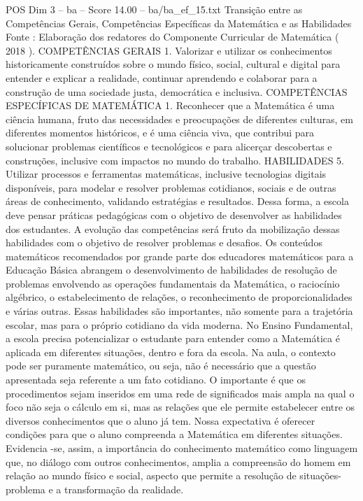 \begin{textsample}{POS Dim 3 – ba – Score 14.00 – ba/ba\_ef\_15.txt}
Transição entre as Competências Gerais, Competências Específicas da Matemática e as Habilidades Fonte : Elaboração dos redatores do Componente Curricular de Matemática ( 2018 ).
COMPETÊNCIAS GERAIS 1.
Valorizar e utilizar os conhecimentos historicamente construídos sobre o mundo físico, social, cultural e digital para entender e explicar a realidade, continuar aprendendo e colaborar para a construção de uma sociedade justa, democrática e inclusiva.
COMPETÊNCIAS ESPECÍFICAS DE MATEMÁTICA 1.
Reconhecer que a Matemática é uma ciência humana, fruto das necessidades e preocupações de diferentes culturas, em diferentes momentos históricos, e é uma ciência viva, que contribui para solucionar problemas científicos e tecnológicos e para alicerçar descobertas e construções, inclusive com impactos no mundo do trabalho.
HABILIDADES 5.
Utilizar processos e ferramentas matemáticas, inclusive tecnologias digitais disponíveis, para modelar e resolver problemas cotidianos, sociais e de outras áreas de conhecimento, validando estratégias e resultados.
Dessa forma, a escola deve pensar práticas pedagógicas com o objetivo de desenvolver as habilidades dos estudantes.
A evolução das competências será fruto da mobilização dessas habilidades com o objetivo de resolver problemas e desafios.
Os conteúdos matemáticos recomendados por grande parte dos educadores matemáticos para a Educação Básica abrangem o desenvolvimento de habilidades de resolução de problemas envolvendo as operações fundamentais da Matemática, o raciocínio algébrico, o estabelecimento de relações, o reconhecimento de proporcionalidades e várias outras.
Essas habilidades são importantes, não somente para a trajetória escolar, mas para o próprio cotidiano da vida moderna.
No Ensino Fundamental, a escola precisa potencializar o estudante para entender como a Matemática é aplicada em diferentes situações, dentro e fora da escola.
Na aula, o contexto pode ser puramente matemático, ou seja, não é necessário que a questão apresentada seja referente a um fato cotidiano.
O importante é que os procedimentos sejam inseridos em uma rede de significados mais ampla na qual o foco não seja o cálculo em si, mas as relações que ele permite estabelecer entre os diversos conhecimentos que o aluno já tem.
Nossa expectativa é oferecer condições para que o aluno compreenda a Matemática em diferentes situações.
Evidencia -se, assim, a importância do conhecimento matemático como linguagem que, no diálogo com outros conhecimentos, amplia a compreensão do homem em relação ao mundo físico e social, aspecto que permite a resolução de situações-problema e a transformação da realidade.

\end{textsample}
